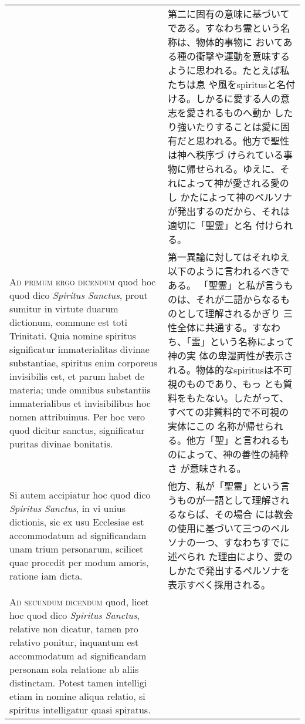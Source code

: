 \documentclass[10pt]{jsarticle} %
\begin{document}
\begin{longtable}{p{21em}p{21em}}
&


第二に固有の意味に基づいてである。すなわち霊という名称は、物体的事物に
 おいてある種の衝撃や運動を意味するように思われる。たとえば私たちは息
 や風をspiritusと名付ける。しかるに愛する人の意志を愛されるものへ動か
 したり強いたりすることは愛に固有だと思われる。他方で聖性は神へ秩序づ
 けられている事物に帰せられる。ゆえに、それによって神が愛される愛のし
 かたによって神のペルソナが発出するのだから、それは適切に「聖霊」と名
 付けられる。

\\



{\scshape Ad primum ergo dicendum} quod hoc quod dico {\itshape Spiritus Sanctus}, prout
sumitur in virtute duarum dictionum, commune est toti Trinitati. Quia
nomine spiritus significatur immaterialitas divinae substantiae,
spiritus enim corporeus invisibilis est, et parum habet de materia;
unde omnibus substantiis immaterialibus et invisibilibus hoc nomen
attribuimus. Per hoc vero quod dicitur sanctus, significatur puritas
divinae bonitatis. 

&


第一異論に対してはそれゆえ以下のように言われるべきである。
「聖霊」と私が言うものは、それが二語からなるものとして理解されるかぎり
 三性全体に共通する。すなわち、「霊」という名称によって神の実
 体の卑湿両性が表示される。物体的なspiritusは不可視のものであり、もっ
 とも質料をもたない。したがって、すべての非質料的で不可視の実体にこの
 名称が帰せられる。他方「聖」と言われるものによって、神の善性の純粋さ
 が意味される。

\\


Si autem accipiatur hoc quod dico {\itshape Spiritus Sanctus},
in vi unius dictionis, sic ex usu Ecclesiae est accommodatum ad
significandam unam trium personarum, scilicet quae procedit per modum
amoris, ratione iam dicta.


&

他方、私が「聖霊」という言うものが一語として理解されるならば、その場合
 には教会の使用に基づいて三つのペルソナの一つ、すなわちすでに述べられ
 た理由により、愛のしかたで発出するペルソナを表示すべく採用される。



\\




{\scshape Ad secundum dicendum} quod, licet hoc quod dico {\itshape Spiritus Sanctus},
relative non dicatur, tamen pro relativo ponitur, inquantum est
accommodatum ad significandam personam sola relatione ab aliis
distinctam. Potest tamen intelligi etiam in nomine aliqua relatio, si
spiritus intelligatur quasi spiratus.


\end{longtable}
\end{document}
